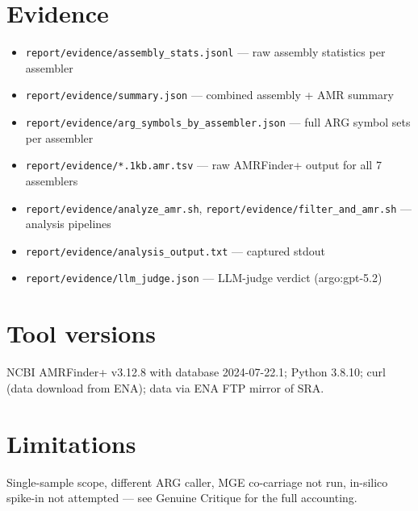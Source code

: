 \documentclass[11pt]{article}
\begin{document}
\section{Evidence}
\begin{itemize}
\item \texttt{report/evidence/assembly\_stats.jsonl} --- raw assembly statistics per assembler
\item \texttt{report/evidence/summary.json} --- combined assembly + AMR summary
\item \texttt{report/evidence/arg\_symbols\_by\_assembler.json} --- full ARG symbol sets per assembler
\item \texttt{report/evidence/*.1kb.amr.tsv} --- raw AMRFinder+ output for all 7 assemblers
\item \texttt{report/evidence/analyze\_amr.sh}, \texttt{report/evidence/filter\_and\_amr.sh} --- analysis pipelines
\item \texttt{report/evidence/analysis\_output.txt} --- captured stdout
\item \texttt{report/evidence/llm\_judge.json} --- LLM-judge verdict (argo:gpt-5.2)
\end{itemize}

\section{Tool versions}
NCBI AMRFinder+ v3.12.8 with database 2024-07-22.1; Python 3.8.10; curl (data download from ENA); data via ENA FTP mirror of SRA.

\section{Limitations}
Single-sample scope, different ARG caller, MGE co-carriage not run, in-silico spike-in not attempted --- see Genuine Critique for the full accounting.
\end{document}
